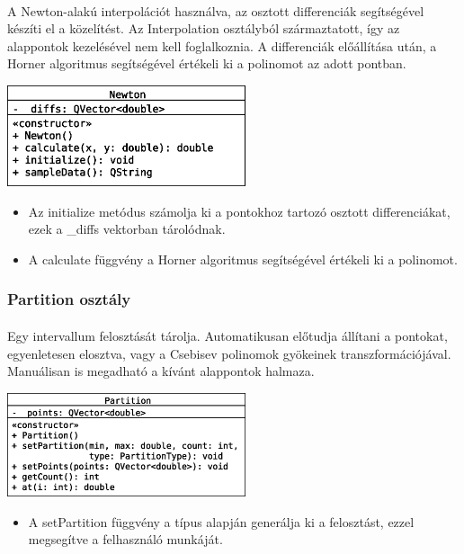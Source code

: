\documentclass[12pt]{report}
\begin{document}
\paragraph{}
A Newton-alakú interpolációt használva, az osztott differenciák segítségével készíti el a közelítést. Az Interpolation osztályból származtatott, így az alappontok kezelésével nem kell foglalkoznia. A differenciák előállítása után, a Horner algoritmus segítségével értékeli ki a polinomot az adott pontban.
\begin{center}
\includegraphics[width=7cm]{pics/uml/Newton}
\end{center}
\begin{itemize}
\item Az initialize metódus számolja ki a pontokhoz tartozó osztott differenciákat, ezek a \_diffs vektorban tárolódnak.
\item A calculate függvény a Horner algoritmus segítségével értékeli ki a polinomot.
\end{itemize}

\subsubsection{Partition osztály}
\paragraph{}
Egy intervallum felosztását tárolja. Automatikusan előtudja állítani a pontokat, egyenletesen elosztva, vagy a Csebisev polinomok gyökeinek transzformációjával. Manuálisan is megadható a kívánt alappontok halmaza.
\begin{center}
\includegraphics[width=7cm]{pics/uml/Partition}
\end{center}
\begin{itemize}
\item A setPartition függvény a típus alapján generálja ki a felosztást, ezzel megsegítve a felhasználó munkáját.
\end{itemize}
\end{document}
